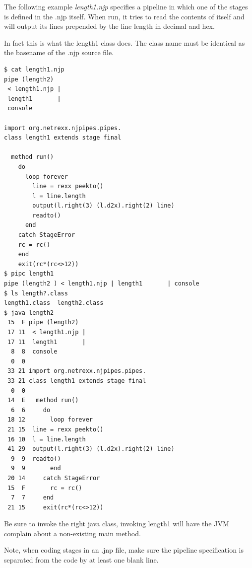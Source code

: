 The following example \emph{length1.njp} specifies a pipeline in which one of the stages is defined in the .njp itself.
When run, it tries to read the contents of itself and will output its lines prepended by the line length in
decimal and hex.

In fact this is what the \nr{} length1 class does.
The class name must be identical as the basename of the .njp source file.

\begin{lstlisting}
$ cat length1.njp
pipe (length2)
 < length1.njp |
 length1       |
 console

import org.netrexx.njpipes.pipes.
class length1 extends stage final

  method run()
    do
      loop forever
	    line = rexx peekto()
     	l = line.length
    	output(l.right(3) (l.d2x).right(2) line)
    	readto()
      end
    catch StageError
    rc = rc()
    end
    exit(rc*(rc<>12))
$ pipc length1
pipe (length2 ) < length1.njp | length1       | console
$ ls length?.class
length1.class  length2.class
$ java length2
 15  F pipe (length2)
 17 11  < length1.njp |
 17 11  length1       |
  8  8  console
  0  0
 33 21 import org.netrexx.njpipes.pipes.
 33 21 class length1 extends stage final
  0  0
 14  E   method run()
  6  6     do
 18 12       loop forever
 21 15 	line = rexx peekto()
 16 10 	l = line.length
 41 29 	output(l.right(3) (l.d2x).right(2) line)
  9  9 	readto()
  9  9       end
 20 14     catch StageError
 15  F       rc = rc()
  7  7     end
 21 15     exit(rc*(rc<>12))
\end{lstlisting}

Be sure to invoke the right java class, invoking length1 will have the JVM complain about a non-existing main method.

Note, when coding \nr{} stages in an .jnp file, make sure the pipeline specification is separated from the \nr{} code
by at least one blank line.



%  


